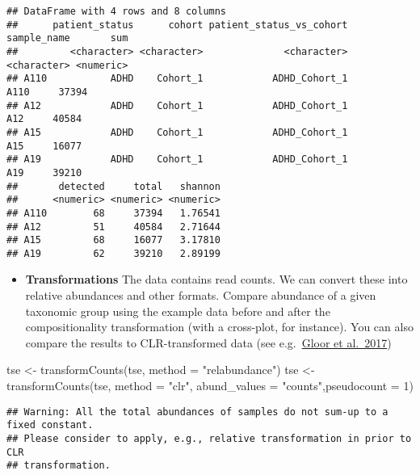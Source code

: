\documentclass[
  oneside]{book}
\newenvironment{Shaded}{\begin{snugshade}}{\end{snugshade}}
\newcommand{\AttributeTok}[1]{\textcolor[rgb]{0.77,0.63,0.00}{#1}}
\newcommand{\DecValTok}[1]{\textcolor[rgb]{0.00,0.00,0.81}{#1}}
\newcommand{\FunctionTok}[1]{\textcolor[rgb]{0.00,0.00,0.00}{#1}}
\newcommand{\NormalTok}[1]{#1}
\newcommand{\OtherTok}[1]{\textcolor[rgb]{0.56,0.35,0.01}{#1}}
\newcommand{\StringTok}[1]{\textcolor[rgb]{0.31,0.60,0.02}{#1}}
\providecommand{\tightlist}{%
  \setlength{\itemsep}{0pt}\setlength{\parskip}{0pt}}
\begin{document}
\begin{verbatim}
## DataFrame with 4 rows and 8 columns
##      patient_status      cohort patient_status_vs_cohort sample_name       sum
##         <character> <character>              <character> <character> <numeric>
## A110           ADHD    Cohort_1            ADHD_Cohort_1        A110     37394
## A12            ADHD    Cohort_1            ADHD_Cohort_1         A12     40584
## A15            ADHD    Cohort_1            ADHD_Cohort_1         A15     16077
## A19            ADHD    Cohort_1            ADHD_Cohort_1         A19     39210
##       detected     total   shannon
##      <numeric> <numeric> <numeric>
## A110        68     37394   1.76541
## A12         51     40584   2.71644
## A15         68     16077   3.17810
## A19         62     39210   2.89199
\end{verbatim}

\begin{itemize}
\tightlist
\item
  \textbf{Transformations} The data contains read counts. We can convert
  these into relative abundances and other formats. Compare abundance
  of a given taxonomic group using the example data before and after
  the compositionality transformation (with a cross-plot, for
  instance). You can also compare the results to CLR-transformed data
  (see e.g.~\href{https://www.frontiersin.org/articles/10.3389/fmicb.2017.02224/full}{Gloor et
  al.~2017})
\end{itemize}

\begin{Shaded}
\begin{Highlighting}[]
\NormalTok{tse }\OtherTok{\textless{}{-}} \FunctionTok{transformCounts}\NormalTok{(tse, }\AttributeTok{method =} \StringTok{"relabundance"}\NormalTok{)}
\NormalTok{tse }\OtherTok{\textless{}{-}} \FunctionTok{transformCounts}\NormalTok{(tse, }\AttributeTok{method =} \StringTok{"clr"}\NormalTok{, }\AttributeTok{abund\_values =} \StringTok{"counts"}\NormalTok{,}\AttributeTok{pseudocount =} \DecValTok{1}\NormalTok{)}
\end{Highlighting}
\end{Shaded}

\begin{verbatim}
## Warning: All the total abundances of samples do not sum-up to a fixed constant.
## Please consider to apply, e.g., relative transformation in prior to CLR
## transformation.
\end{verbatim}
\end{document}
